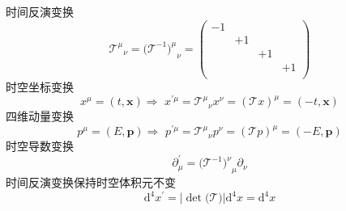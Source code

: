 时间反演变换
\begin{equation}
    {\mathcal{T} ^{\mu}}_{\nu}=(\mathcal{T} ^{-1}{)^{\mu}}_{\nu}=\left( \begin{matrix}
	-1&		&		&		\\
	&		+1&		&		\\
	&		&		+1&		\\
	&		&		&		+1\\
\end{matrix} \right) 
\end{equation}
时空坐标变换
\begin{equation}
    x^{\mu}=\left( t,\mathbf{x} \right) \Rightarrow \,\,x^{\prime \mu}={\mathcal{T} ^{\mu}}_{\nu}x^{\nu}=(\mathcal{T} x)^{\mu}=\left( -t,\mathbf{x} \right) 
\end{equation}
四维动量变换
\begin{equation}
    p^{\mu}=\left( E,\mathbf{p} \right) \Rightarrow \,\,p^{\prime \mu}={\mathcal{T} ^{\mu}}_{\nu}p^{\nu}=(\mathcal{T} p)^{\mu}=\left( -E,\mathbf{p} \right) 
\end{equation}
时空导数变换
\begin{equation}
    \partial _{\mu}^{\prime}=(\mathcal{T} ^{-1}{)^{\nu}}_{\mu}\partial _{\nu}
\end{equation}
时间反演变换保持时空体积元不变
\begin{equation}
    \mathrm{d}^4x^{\prime}=\left| \det\mathrm{(}\mathcal{T} ) \right|\mathrm{d}^4x=\mathrm{d}^4x
\end{equation}




